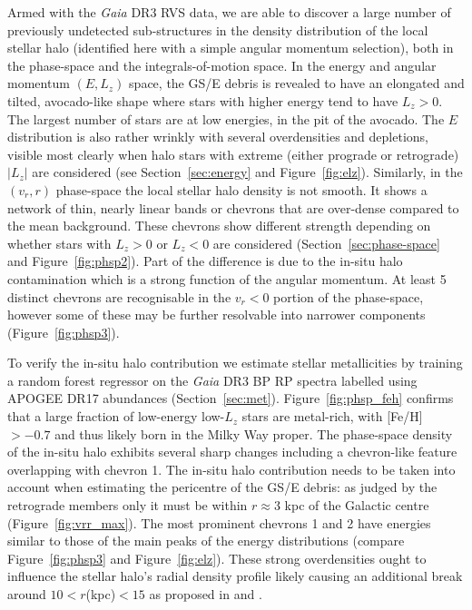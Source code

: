 \documentclass[a4paper,useAMS,usenatbib]{mnras}
\begin{document}
Armed with the {\it Gaia} DR3 RVS data, we are able to discover a large number of previously undetected sub-structures in the density distribution of the local stellar halo (identified here with a simple angular momentum selection), both in the phase-space and the integrals-of-motion space. In the energy and angular momentum $(E, L_z)$ space, the GS/E debris is revealed to have an elongated and tilted, avocado-like shape where stars with higher energy tend to have $L_z>0$. The largest number of stars are at low energies, in the pit of the avocado. The $E$ distribution is also rather wrinkly with several overdensities and depletions, visible most clearly when halo stars with extreme (either prograde or retrograde) $|L_z|$ are considered (see Section~\ref{sec:energy} and Figure~\ref{fig:elz}). Similarly, in the $(v_r,r)$ phase-space the local stellar halo density is not smooth. It shows a network of thin, nearly linear bands or chevrons that are over-dense compared to the mean background. These chevrons show different strength depending on whether stars with $L_z>0$ or $L_z<0$ are considered (Section~\ref{sec:phase-space} and Figure~\ref{fig:phsp2}). Part of the difference is due to the in-situ halo contamination which is a strong function of the angular momentum. At least 5 distinct chevrons are recognisable in the $v_r<0$ portion of the phase-space, however some of these may be further resolvable into narrower components (Figure~\ref{fig:phsp3}).

To verify the in-situ halo contribution we estimate stellar metallicities by training a random forest regressor on the {\it Gaia} DR3 BP RP spectra labelled using APOGEE DR17 abundances (Section~\ref{sec:met}). Figure~\ref{fig:phsp_feh} confirms that a large fraction of low-energy low-$L_z$ stars are metal-rich, with [Fe/H]$>-0.7$ and thus likely born in the Milky Way proper. The phase-space density of the in-situ halo exhibits several sharp changes including a chevron-like feature overlapping with chevron 1. The in-situ halo contribution needs to be taken into account when estimating the pericentre of the GS/E debris: as judged by the retrograde members only it must be within $r\approx3$ kpc of the Galactic centre (Figure~\ref{fig:vrr_max}). The most prominent chevrons 1 and 2 have energies similar to those of the main peaks of the energy distributions (compare Figure~\ref{fig:phsp3} and Figure~\ref{fig:elz}). These strong overdensities ought to influence the stellar halo's radial density profile likely causing an additional break around $10<r$(kpc)$<15$ as proposed in \citet{Naidu2021} and  \citet{Han2022}.
\end{document}
